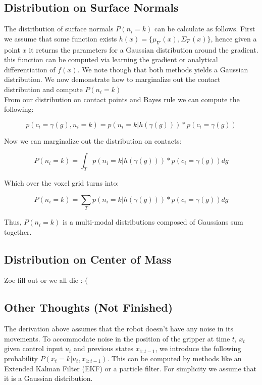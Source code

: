 \documentclass[letterpaper, 10 pt, conference]{ieeeconf}  %
\begin{document}
\subsection{Distribution on Surface Normals} 
The distribution of surface normals $P(n_i = k)$ can be calculate as follows.
First we assume that some function exists $h(x) = \lbrace \mu_{\nabla}(x), \Sigma_{\nabla}(x) \rbrace$, hence given a point $x$ it returns the parameters for a Gaussian distribution around the gradient.
this function can be computed via learning the gradient \cite{gradient} or analytical differentiation of $f(x)$.
We note though that both methods yields a Gaussian distribution.
We now demonstrate how to marginalize out the contact distribution and compute $P(n_i = k)$\\

From our distribution on contact points and Bayes rule we can compute the following: 

\begin{equation}
p(c_i = \gamma(g), n_i = k) = p(n_i = k | h(\gamma(g)))*p(c_i = \gamma(g))
\end{equation}

Now we can marginalize out the distribution on contacts:

\begin{equation}
P(n_i = k) = \int_T  p(n_i = k | h(\gamma(g)))*p(c_i = \gamma(g)) dg
\end{equation}

Which over the voxel grid turns into: 

\begin{equation}
P(n_i = k) = \sum_T  p(n_i = k | h(\gamma(g)))*p(c_i = \gamma(g)) dg
\end{equation}


Thus, $P(n_i = k)$ is a multi-modal distributions  composed of Gaussians sum together. 

\subsection{Distribution on Center of Mass} Zoe fill out or we all die :-(


\subsection{Other Thoughts (Not Finished)}
The derivation above assumes that the robot doesn't have any noise in its movements.
To accommodate noise in the position of the gripper at time $t$, $x_t$ given control input $u_{t}$ and previous states $x_{1:t-1}$, we introduce the following probability $P(x_t=k|u_t,x_{1:t-1})$.
This can be computed by methods like an Extended Kalman Filter (EKF) or a particle filter.
For simplicity we assume that it is a Gaussian distribution. 
\end{document}
